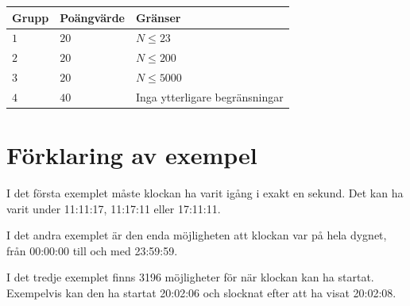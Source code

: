 \noindent
\begin{tabular}{| l | l | l |}
  \hline
  Grupp & Poängvärde & Gränser \\ \hline
  $1$    & $20$        &  $ N \leq 23 $ \\ \hline 
  $2$    & $20$        &  $ N \leq 200 $ \\ \hline
  $3$    & $20$        &  $ N \leq 5000 $ \\ \hline
  $4$    & $40$        &  Inga ytterligare begränsningar \\ \hline
\end{tabular}


\section*{Förklaring av exempel}
I det första exemplet måste klockan ha varit igång i exakt en sekund. Det kan ha varit under 11:11:17, 11:17:11 eller 17:11:11.

I det andra exemplet är den enda möjligheten att klockan var på hela dygnet, från 00:00:00 till och med 23:59:59.

I det tredje exemplet finns 3196 möjligheter för när klockan kan ha startat. Exempelvis kan den ha startat 20:02:06 och slocknat efter att ha visat 20:02:08.
